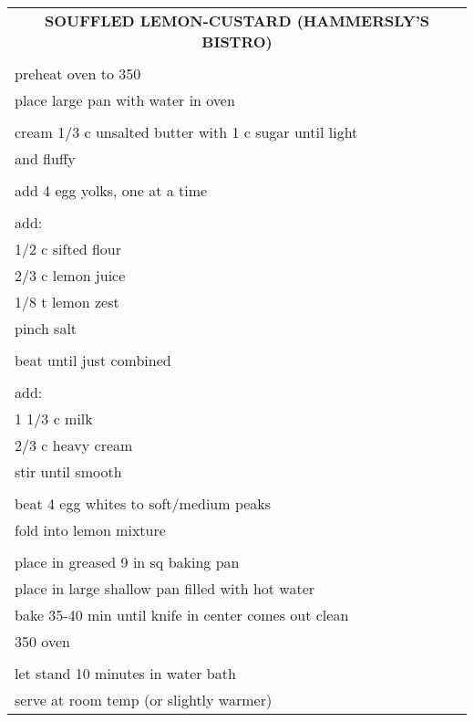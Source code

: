 \documentclass[8pt]{report}
\begin{document}
\newpage

\centering

\begin{tabular}{|l|} \hline	%
 
\multicolumn{1}{|c|}{\textbf{SOUFFLED LEMON-CUSTARD (HAMMERSLY'S BISTRO)}}
\\
\\

\index{desserts!souffled lemon-custard (hammersly's bistro)}
\index{souffled lemon-custard} \index{lemon-custard!souffled}

preheat oven to 350\\
place large pan with water in oven\\
\\
cream 1/3 c unsalted butter with 1 c sugar until light\\
and fluffy\\
\\
add 4 egg yolks, one at a time\\
\\
add: \\
\hspace{0.5 in}	1/2 c sifted flour\\
\hspace{0.5 in}	2/3 c lemon juice\\
\hspace{0.5 in}	1/8 t lemon zest\\
\hspace{0.5 in}	pinch salt\\
\\
beat until just combined\\
\\
add: \\
\hspace{0.5 in}	1 1/3 c milk\\
\hspace{0.5 in}	2/3 c heavy cream\\
\hspace{0.5 in}	stir until smooth\\
\\
beat 4 egg whites to soft/medium peaks\\
fold into lemon mixture\\
\\
place in greased 9 in sq baking pan\\
place in large shallow pan filled with hot water\\
bake 35-40 min until knife in center comes out clean\\
350 oven\\
\\
let stand 10 minutes in water bath\\
serve at room temp (or slightly warmer)\\

\hline

\end{tabular}
\end{document}
